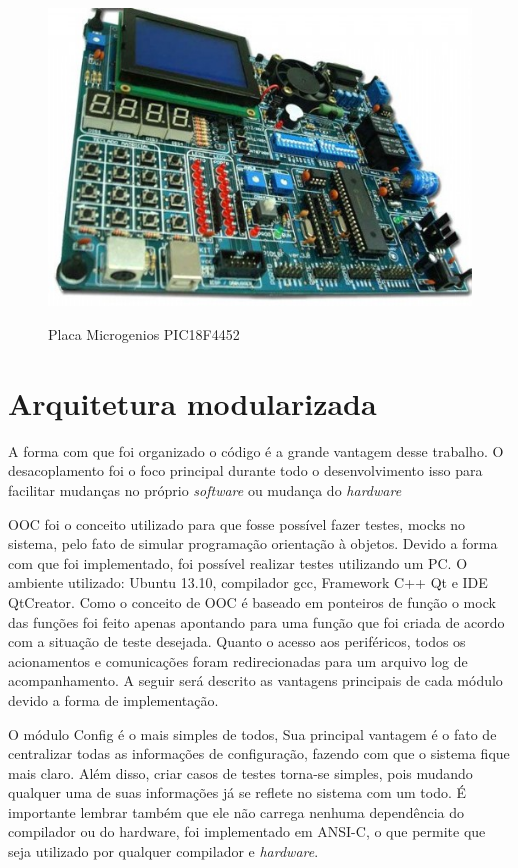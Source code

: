  \begin{figure}[htp]
 	\centering
 	\includegraphics[scale=1]{images/pic_microgenio.png}
 	\caption{Placa Microgenios PIC18F4452}	
 	\label{fig:microgenios}
 	\cite{galvao2013requirements}
 \end{figure}

\section{Arquitetura modularizada}

A forma com que foi organizado o código é a grande vantagem desse trabalho. O desacoplamento foi o foco principal durante todo o desenvolvimento isso para facilitar mudanças no próprio \emph{software} ou mudança do \emph{hardware}

OOC foi o conceito utilizado para que fosse possível fazer testes, mocks no sistema, pelo fato de simular programação orientação à objetos. Devido a forma com que foi implementado, foi possível realizar testes utilizando um PC. O ambiente utilizado: Ubuntu 13.10, compilador gcc, Framework C++ Qt e IDE QtCreator. Como o conceito de OOC é baseado em ponteiros de função o mock das funções foi feito apenas apontando para uma função que foi criada de acordo com a situação de teste desejada. Quanto o acesso aos periféricos, todos os acionamentos e comunicações foram redirecionadas para um arquivo log de acompanhamento. A seguir será descrito as vantagens principais de cada módulo devido a forma de implementação.

O módulo Config é o mais simples de todos, Sua principal vantagem é o fato de centralizar todas as informações de configuração, fazendo com que o sistema fique mais claro. Além disso, criar casos de testes torna-se simples, pois mudando qualquer uma de suas informações já se reflete no sistema com um todo. É importante lembrar também que ele não carrega nenhuma dependência do compilador ou do hardware, foi implementado em ANSI-C, o que permite que seja utilizado por qualquer compilador e \emph{hardware}.

